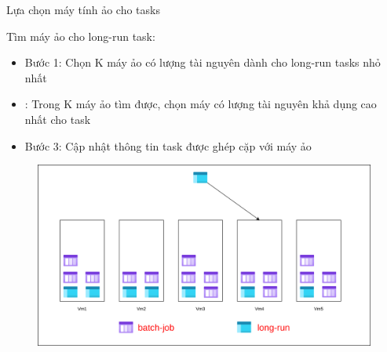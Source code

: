 \documentclass[11pt,xcolor={dvipsnames}, aspectratio=169]{beamer}
\begin{document}
\begin{frame}
{Lựa chọn máy tính ảo cho tasks}

	\begin{minipage}[t]{0.4\linewidth}
		\vspace{0.5cm}
		Tìm máy ảo cho long-run task: 
		\begin{itemize}
			\item Bước 1: Chọn K máy ảo có lượng tài nguyên dành cho long-run tasks nhỏ nhất 
			\item {\color{red}{Bước 2}}: Trong K máy ảo tìm được, chọn máy có lượng tài nguyên khả dụng cao nhất cho task 
			\item Bước 3: Cập nhật thông tin task được ghép cặp với máy ảo
		\end{itemize}
	\end{minipage}
	\hfill
	\begin{minipage}[t]{0.59\linewidth}
	\begin{figure}
		\vspace{1cm}
		\includegraphics[scale=0.35]{images/balancing_tasks4.png}
	\end{figure}
	\vspace{1cm}
	\end{minipage}
\end{frame}
\end{document}
